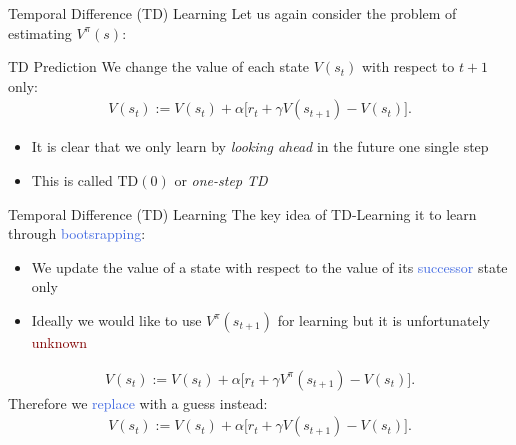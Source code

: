 \documentclass{beamer}
\begin{document}
\begin{frame}{Temporal Difference (TD) Learning}
	Let us again consider the problem of estimating $V^{\pi}(s)$:
	\begin{block}{TD Prediction}
		We change the value of each state $V(s_t)$ with respect to $t+1$ only:
		\begin{align*}
			V(s_t):= V(s_t) + \alpha \big[r_t + \gamma V(s_{t+1}) - V(s_t)\big].
		\end{align*}
	\end{block}
	
	\begin{itemize}
		\item It is clear that we only learn by \textit{looking ahead} in the future one single step
		\item This is called $\text{TD}(0)$ or \textit{one-step TD}
	\end{itemize}

\end{frame}


\begin{frame}{Temporal Difference (TD) Learning}
	The key idea of TD-Learning it to learn through \textcolor{RoyalBlue}{bootsrapping}:
	\begin{itemize}
		\item We update the value of a state with respect to the value of its \textcolor{RoyalBlue}{successor} state only
		\item Ideally we would like to use $V^{\pi}(s_{t+1})$ for learning but it is unfortunately \textcolor{Maroon}{unknown}
	\end{itemize}	
	\begin{align*}
		V(s_t):= V(s_t) + \alpha \big[r_t + \gamma V^{\pi}(s_{t+1}) - V(s_t)\big].
	\end{align*}
	Therefore we \textcolor{RoyalBlue}{replace} with a guess instead:
	\begin{align*}
		V(s_t):= V(s_t) + \alpha \big[r_t + \gamma V(s_{t+1}) - V(s_t)\big].
	\end{align*}
	
\end{frame}
\end{document}
